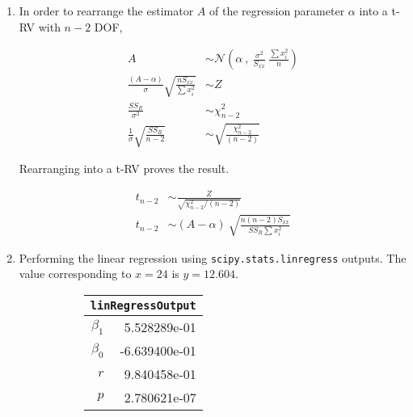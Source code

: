 \begin{enumerate}
\item In order to rearrange the estimator $ A $ of the regression parameter $ \alpha $ into a t-RV with $ n-2 $ DOF,

\begin{align}
	A &\sim \mathcal{N}\left(\alpha\ ,\ \frac{\sigma^2}{S_{xx}}\ \frac{\sum x_i^2}{n}\right) \nonumber \\
	\frac{(A - \alpha)}{\sigma} \sqrt{\frac{nS_{xx}}{\sum x_i^2}} &\sim Z \\ 
	\frac{SS_R}{\sigma^2} &\sim \chi^2_{n-2} \nonumber \\
	\frac{1}{\sigma} \sqrt{\frac{SS_R}{n-2}} &\sim \sqrt{\frac{\chi^2_{n-2}}{(n-2)}}
\end{align}

Rearranging into a t-RV proves the result.

\begin{align}
	t_{n-2} &\sim \frac{Z}{\sqrt{\chi^2_{n-2} / (n-2)}} \nonumber \\
	t_{n-2} &\sim (A - \alpha)\ \sqrt{\frac{n(n-2)S_{xx}}{SS_R \sum x_i^2}}
\end{align}

\item Performing the linear regression using \texttt{scipy.stats.linregress} outputs.
The value corresponding to $ x = 24 $ is $ y = 12.604 $.

\begin{figure}[H]
	\begin{subfigure}[]{0.2\linewidth}
		\centering
		\begin{tabular}{@{}rr@{}}
			\toprule
			\multicolumn{2}{c}{\texttt{linRegressOutput}} \\
			\midrule
			$\beta_1$     &     5.528289e-01 \\
			$\beta_0$ &    -6.639400e-01 \\
			$r$    &     9.840458e-01 \\
			$p$    &     2.780621e-07 \\
			\bottomrule
		\end{tabular}
		
	\end{subfigure}
	\begin{subfigure}[]{0.8\linewidth}
		\centering
		
	\end{subfigure}
\end{figure}


\end{enumerate}
